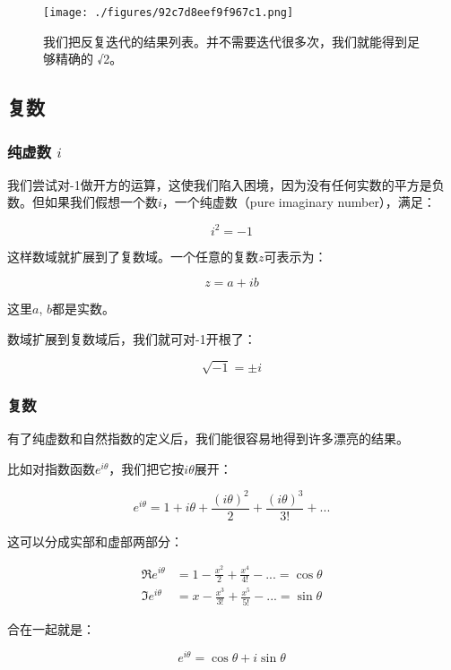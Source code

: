 \begin{figure}[ht]
\centering
\texttt{[image: ./figures/92c7d8eef9f967c1.png]}
\caption{ 我们把反复迭代的结果列表。并不需要迭代很多次，我们就能得到⾜够精确的 √2。} \label{fig_QMPre6_2}
\end{figure}

\subsection{复数}

\subsubsection{纯虚数 $i$}


我们尝试对-1做开方的运算，这使我们陷入困境，因为没有任何实数的平方是负数。但如果我们假想一个数$i$，一个纯虚数（pure imaginary number），满足：

\begin{equation}
i^2 = -1~
\end{equation}

这样数域就扩展到了复数域。一个任意的复数$z$可表示为：

\begin{equation}
z = a + ib~
\end{equation}

这里$a$, $b$都是实数。

数域扩展到复数域后，我们就可对-1开根了：

\begin{equation}
\sqrt{-1} = \pm i~
\end{equation}

\subsubsection{复数}

有了纯虚数和自然指数的定义后，我们能很容易地得到许多漂亮的结果。

比如对指数函数$e^{i \theta}$，我们把它按$i \theta$展开：

\begin{equation}
e^{i \theta} = 1 + i \theta + \frac{(i \theta)^2}{2}+ \frac{(i \theta)^3}{3!} + ...~
\end{equation}

这可以分成实部和虚部两部分：

\begin{align}
\Re e^{i \theta} & =  1 - \frac{x^2}{2} + \frac{x^4}{4!} - ... = \cos \theta   \\
\Im e^{i \theta} & =  x - \frac{x^3}{3!} + \frac{x^5}{5!} - ... = \sin \theta ~
\end{align}

合在一起就是：

\begin{equation}
e^{i \theta} = \cos \theta + i \sin \theta~
\end{equation}